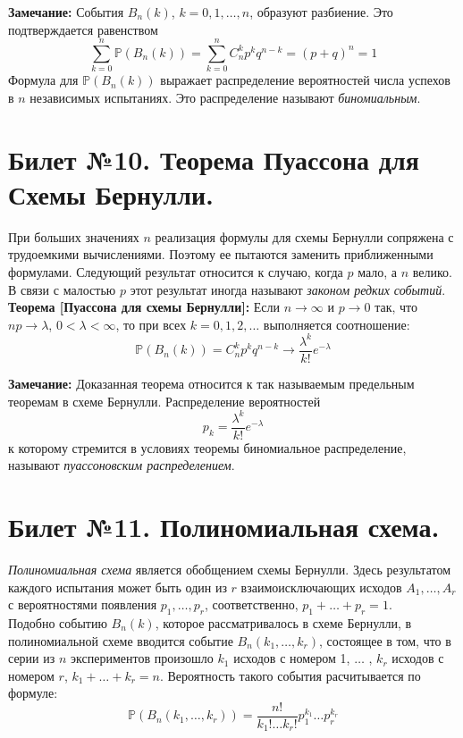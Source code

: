 \textbf{Замечание:} События $B_n(k)$, $k = 0, 1, \dots , n$, образуют разбиение. Это подтверждается равенством
\[ \sum_{k = 0}^{n}{\mathbb{P}(B_n(k))} = \sum_{k = 0}^{n}{C_{n}^{k} p^k q^{n - k}} = (p + q)^n = 1 \]
Формула для $\mathbb{P}(B_n(k))$ выражает распределение вероятностей числа успехов в $n$ независимых испытаниях. Это распределение называют \textit{биномиальным}.

\section{Билет №10. Теорема Пуассона для Схемы Бернулли.}

\hspace*{\parindent} При больших значениях $n$ реализация формулы для схемы Бернулли сопряжена с трудоемкими вычислениями. Поэтому ее пытаются заменить приближенными формулами. Следующий результат относится к случаю, когда $p$ мало, а $n$ велико. В связи с малостью $p$ этот результат иногда называют \textit{законом редких событий}.\\

\textbf{Теорема [Пуассона для схемы Бернулли]:} Если $n \rightarrow \infty$ и $p \rightarrow 0$ так, что $np \rightarrow \lambda$, $0 < \lambda < \infty$, то при всех $k = 0, 1, 2, \dots $ выполняется соотношение:
\begin{equation*}
	\mathbb{P}(B_n (k)) = C_{n}^{k} p^k q^{n - k} \rightarrow \frac{\lambda^k}{k!}e^{- \lambda}
\end{equation*}

\textbf{Замечание:} Доказанная теорема относится к так называемым предельным теоремам в схеме Бернулли. Распределение вероятностей
\[ p_k = \frac{\lambda^k}{k!}e^{- \lambda} \]
к которому стремится в условиях теоремы биномиальное распределение, называют \textit{пуассоновским распределением}.

\section{Билет №11. Полиномиальная схема.}

\hspace*{\parindent} \textit{Полиномиальная схема} является обобщением схемы Бернулли. Здесь результатом каждого испытания может быть один из $r$ взаимоисключающих исходов $A_1, \dots, A_r$ с вероятностями появления $p_1, \dots, p_r$, соответственно, $p_1 + \dots + p_r = 1$.\\

Подобно событию $B_n(k)$, которое рассматривалось в схеме Бернулли, в полиномиальной схеме вводится событие $B_n(k_1, \dots, k_r)$, состоящее в том, что в серии из $n$ экспериментов произошло $k_1$ исходов с номером 1, $\dots$ , $k_r$ исходов с номером $r$, $k_1 + \dots+ k_r = n$. Вероятность такого события расчитывается по формуле:
\begin{equation*}
	\mathbb{P}(B_n(k_1, \dots, k_r)) = \frac{n!}{k_1! \dots k_r!}p_1^{k_1} \dots p_r^{k_r}
\end{equation*}


